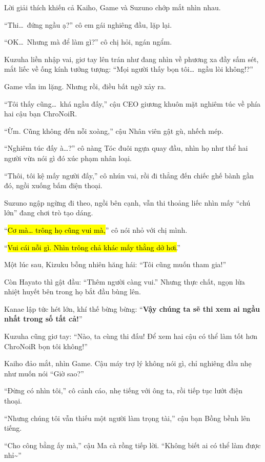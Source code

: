 \documentclass[../main.tex]{subfiles}
\begin{document}
Lời giải thích khiến cả Kaiho, Game và Suzuno chớp mắt nhìn nhau.

``Thi\dots\ đứng ngầu ạ?'' cô em gái nghiêng đầu, lặp lại.

``OK\dots\ Nhưng mà để làm gì?'' cô chị hỏi, ngán ngẩm.

Kuzuha liền nhập vai, giơ tay lên trán như đang nhìn về phương xa đầy sấm sét, mắt liếc về ống kính tưởng tượng: ``Mọi người thấy bọn tôi\dots\ ngầu lòi không!?''

Game vẫn im lặng. Nhưng rồi, điều bất ngờ xảy ra.

``Tôi thấy cũng\dots\ khá ngầu đấy,'' cậu CEO giương khuôn mặt nghiêm túc về phía hai cậu bạn ChroNoiR.

``Ừm. Cũng không đến nỗi xoàng,'' cậu Nhân viên gật gù, nhếch mép.

``Nghiêm túc đấy à\dots?'' cô nàng Tóc đuôi ngựa quay đầu, nhìn họ như thể hai người vừa nói gì đó xúc phạm nhân loại.

``Thôi, tôi kệ mấy người đấy,'' cô nhún vai, rồi đi thẳng đến chiếc ghế bành gần đó, ngồi xuống bấm điện thoại.

Suzuno ngập ngừng đi theo, ngồi bên cạnh, vẫn thi thoảng liếc nhìn mấy ``chú lớn'' đang chơi trò tạo dáng.

``\hl{Cơ mà\dots{} trông họ cũng vui mà,}'' cô nói nhỏ với chị mình.

``\hl{Vui cái nỗi gì. Nhìn trông chả khác mấy thằng dở hơi.}''

Một lúc sau, Kizuku bỗng nhiên hăng hái: ``Tôi cũng muốn tham gia!''

Còn Hayato thì gật đầu: ``Thêm người càng vui.'' Nhưng thực chất, ngọn lửa nhiệt huyết bên trong họ bắt đầu bùng lên.


Kanae lập tức hét lớn, khí thế bừng bừng: ``\textbf{Vậy chúng ta sẽ thi xem ai ngầu nhất trong số tất cả!}''

Kuzuha cũng giơ tay: ``Nào, ta cùng thi đấu! Để xem hai cậu có thể làm tốt hơn ChroNoiR bọn tôi không!''

Kaiho đảo mắt, nhìn Game. Cậu máy trợ lý không nói gì, chỉ nghiêng đầu nhẹ như muốn nói ``Giờ sao?''

``Đừng có nhìn tôi,'' cô cảnh cáo, nhẹ tiếng với ông ta, rồi tiếp tục lướt điện thoại.

``Nhưng chúng tôi vẫn thiếu một người làm trọng tài,'' cậu bạn Bồng bềnh lên tiếng.

``Cho công bằng ấy mà,'' cậu Ma cà rồng tiếp lời. ``Không biết ai có thể làm được nhỉ\~{}''
\end{document}
